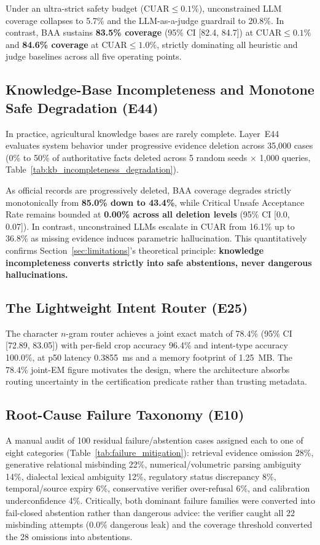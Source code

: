 Under an ultra-strict safety budget ($\text{CUAR} \le 0.1\%$), unconstrained LLM coverage collapses to 5.7\% and the LLM-as-a-judge guardrail to 20.8\%. In contrast, BAA sustains \textbf{83.5\% coverage} (95\% CI [82.4, 84.7]) at $\text{CUAR} \le 0.1\%$ and \textbf{84.6\% coverage} at $\text{CUAR} \le 1.0\%$, strictly dominating all heuristic and judge baselines across all five operating points.

\subsection{Knowledge-Base Incompleteness and Monotone Safe Degradation (E44)}
In practice, agricultural knowledge bases are rarely complete. Layer~E44 evaluates system behavior under progressive evidence deletion across 35{,}000 cases (0\% to 50\% of authoritative facts deleted across 5 random seeds $\times$ 1{,}000 queries, Table~\ref{tab:kb_incompleteness_degradation}).



As official records are progressively deleted, BAA coverage degrades strictly monotonically from \textbf{85.0\% down to 43.4\%}, while Critical Unsafe Acceptance Rate remains bounded at \textbf{0.00\% across all deletion levels} (95\% CI [0.0, 0.07]). In contrast, unconstrained LLMs escalate in CUAR from 16.1\% up to 36.8\% as missing evidence induces parametric hallucination. This quantitatively confirms Section~\ref{sec:limitations}'s theoretical principle: \textbf{knowledge incompleteness converts strictly into safe abstentions, never dangerous hallucinations.}

\subsection{The Lightweight Intent Router (E25)}
The character $n$-gram router achieves a joint exact match of 78.4\% (95\% CI [72.89, 83.05]) with per-field crop accuracy 96.4\% and intent-type accuracy 100.0\%, at p50 latency 0.3855~ms and a memory footprint of 1.25~MB. The 78.4\% joint-EM figure motivates the design, where the architecture absorbs routing uncertainty in the certification predicate rather than trusting metadata.

\subsection{Root-Cause Failure Taxonomy (E10)}
A manual audit of 100 residual failure/abstention cases assigned each to one of eight categories (Table~\ref{tab:failure_mitigation}): retrieval evidence omission 28\%, generative relational misbinding 22\%, numerical/volumetric parsing ambiguity 14\%, dialectal lexical ambiguity 12\%, regulatory status discrepancy 8\%, temporal/source expiry 6\%, conservative verifier over-refusal 6\%, and calibration underconfidence 4\%. Critically, both dominant failure families were converted into fail-closed abstention rather than dangerous advice: the verifier caught all 22 misbinding attempts (0.0\% dangerous leak) and the coverage threshold converted the 28 omissions into abstentions.

